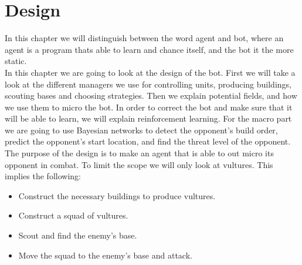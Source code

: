 \chapter{Design}\label{design}
	In this chapter we will distinguish between the word agent and bot, where an agent is a program thats able to learn and chance itself, and the bot it the more static. \\
	
	In this chapter we are going to look at the design of the bot. First we will take a look at the different managers we use for controlling units, producing buildings, scouting bases and choosing strategies. Then we explain potential fields, and how we use them to micro the bot. In order to correct the bot and make sure that it will be able to learn, we will explain reinforcement learning. For the macro part we are going to use Bayesian networks to detect the opponent's build order, predict the opponent's start location, and find the threat level of the opponent.	\\
	
	The purpose of the design is to make an agent that is able to out micro its opponent in combat. To limit the scope we will only look at vultures. 
	This implies the following:
	\begin{itemize}
		\item Construct the necessary buildings to produce vultures.
		\item Construct a squad of vultures.
		\item Scout and find the enemy's base.
		\item Move the squad to the enemy's base and attack.
	\end{itemize}
	
	
	
	
	
	
	
	
